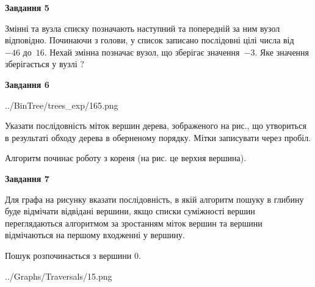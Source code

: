 \documentclass[12pt, ukrainian]{article}
\begin{document}
{\begin {large}
{\begin {center}\textbf{Завдання 5}\end {center}}\par
Змінні  та  вузла списку позначають наступний та попередній за ним вузол відповідно. Починаючи з голови, у список записано послідовні цілі числа від~$-46$ до~$16$. Нехай змінна  позначає вузол, що зберігає значення~$-3$.
Яке значення зберігається у вузлі  ?\par
\newpage

{\begin {center}\textbf{Завдання 6}\end {center}}\par

\begin{center}
	{../BinTree/trees_exp/165.png}
\end{center}
Указати послідовність міток вершин дерева, зображеного на рис., що утвориться в результаті обходу дерева в оберненому порядку. Мітки записувати через пробіл.\par Алгоритм починає роботу з кореня (на рис. це верхня вершина).\par
\newpage

{\begin {center}\textbf{Завдання 7}\end {center}}\par
Для графа на рисунку вказати послідовність, в якій алгоритм пошуку в глибину буде відмічати відвідані вершини, якщо списки суміжності вершин переглядаються алгоритмом за зростанням міток вершин та вершини відмічаються на першому вход\-женні у вершину.\par
Пошук розпочинається з вершини 0.\par

\begin{center}
	{../Graphs/Traversals/15.png}
\end{center}\par
\newpage


\end{large}}
\end{document}
